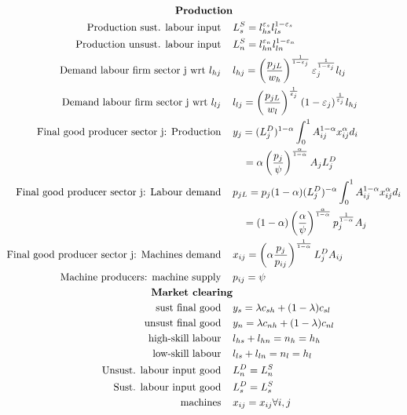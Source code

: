 \begin{align}
\text{\textbf{Production}}& \nonumber \\
\text{Production sust. labour input} \hspace{4mm}& L_s^S =l_{hs}^{\varepsilon_s}l_{ls}^{1-\varepsilon_s}\\ 
\text{Production unsust. labour input} \hspace{4mm}& L_n^S =l_{hn}^{\varepsilon_n}l_{ln}^{1-\varepsilon_n}\\
\text{Demand labour firm sector j wrt } l_{hj}\hspace{4mm}&l_{hj}= \left(\frac{p_{jL}}{w_h}\right)^{\frac{1}{1-\varepsilon_j}}\varepsilon_j^{\frac{1}{1-\varepsilon_j}}l_{lj}\\
\text{Demand labour firm sector j wrt } l_{lj}\hspace{4mm}&
l_{lj}= \left(\frac{p_{jL}}{w_l}\right)^\frac{1}{\varepsilon_j}(1-\varepsilon_j)^\frac{1}{\varepsilon_j}l_{hj}\\
\text{Final good producer sector j: Production}\hspace{4mm}&y_j=(L_j^D)^{1-\alpha}\int_{0}^{1}A_{ij}^{1-\alpha}x_{ij}^\alpha d_i\\
&\ \ \  = \alpha \left(\frac{p_j}{\psi}\right)^{\frac{\alpha}{1-\alpha}}A_j L_j^D \nonumber \\ 
\text{Final good producer sector j: Labour demand}\hspace{4mm}&
p_{jL} = p_j(1-\alpha) (L_j^D)^{-\alpha}\int_{0}^{1}A_{ij}^{1-\alpha}x_{ij}^\alpha d_i\\
& \ \ \ = (1-\alpha)\left(\frac{\alpha}{\psi}\right)^\frac{\alpha}{1- \alpha}p_j^\frac{1}{1-\alpha}A_j\nonumber
\\
\text{Final good producer sector j: Machines demand}\hspace{4mm}&
x_{ij} = \left(\alpha\frac{p_j}{p_{ij}}\right)^\frac{1}{1-\alpha}L_j^D A_{ij}\\
\text{Machine producers: machine supply}\hspace{4mm}& p_{ij}=\psi\\
%
\text{\textbf{Market clearing}}& \nonumber\\
\text{sust final good}\hspace{4mm}& y_s=\lambda c_{sh}+(1-\lambda) c_{sl}\\
\text{unsust final good}\hspace{4mm}& y_n=\lambda c_{nh}+(1-\lambda) c_{nl}\\
\text{high-skill labour}\hspace{4mm}& l_{hs}+l_{hn}=n_h=h_h\\
\text{low-skill labour}\hspace{4mm}&l_{ls}+l_{ln}=n_l=h_l\\
\text{Unsust. labour input good}\hspace{4mm}&L_n^D=L_n^S\\
\text{Sust. labour input good}\hspace{4mm}&L_s^D=L_s^S\\
\text{machines}\hspace{4mm}&x_{ij}=x_{ij} \forall i,j
\end{align}

